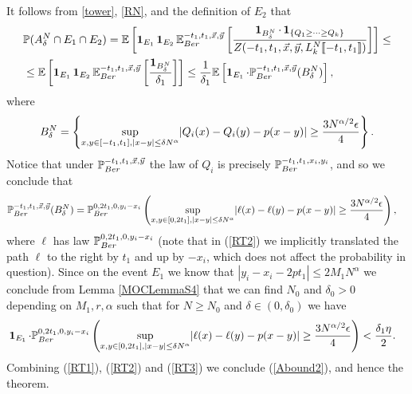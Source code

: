 It follows from \eqref{tower}, \eqref{RN}, and the definition of $E_2$ that
\begin{equation}\label{RT1}
\begin{split}
&\mathbb{P}(A^N_\delta\cap E_1\cap E_2) =\mathbb{E}\left[\operatorname{\mathbf{1}}_{E_1}\operatorname{\mathbf{1}}_{E_2} \mathbb{E}_{Ber}^{-t_1, t_1,\vec x,\vec y}\left[\frac{\operatorname{\mathbf{1}}_{B^N_\delta}\cdot \operatorname{\mathbf{1}}_{\left\{Q_1\geq\cdots\geq Q_{k}\right\}}}{Z(-t_1,t_1,\vec x, \vec y, L^N_{k} \llbracket -t_1, t_1 \rrbracket)}\right]\right] \leq \\
&\leq \mathbb{E}\left[\operatorname{\mathbf{1}}_{E_1}\operatorname{\mathbf{1}}_{E_2}\mathbb{E}_{Ber}^{-t_1,t_1,\vec x,\vec y}\left[\frac{\operatorname{\mathbf{1}}_{B^N_\delta}}{\delta_1}\right]\right] \leq \frac{1}{\delta_1} \mathbb{E}\left[ \operatorname{\mathbf{1}}_{E_1} \cdot\mathbb{P}_{Ber}^{-t_1,t_1,\vec{x}, \vec{y} }(B^N_\delta) \right],
\end{split}
\end{equation}
where 
$$B^N_\delta = \left\{\sup_{{x,y\in [-t_1,t_1], |x-y|\leq \delta N^\alpha}} \abs*{Q_i(x)-Q_i(y)-p(x-y)}\geq \frac{3N^{\alpha/2}\epsilon}4\right\}.$$
Notice that under $\mathbb{P}_{Ber}^{-t_1,t_1,\vec{x}, \vec{y} }$ the law of $Q_i$ is precisely $\mathbb{P}_{Ber}^{-t_1,t_1,x_i, y_i }$, and so we conclude that 
\begin{equation}\label{RT2}
\begin{split}
& \pr_{Ber}^{-t_1,t_1,\vec{x}, \vec{y} }(B^N_\delta) = \pr_{Ber}^{0,2t_1,0, y_i - x_i }\left( \sup_{{x,y\in [0,2t_1], |x-y|\leq \delta N^\alpha}} \abs*{\ell(x)-\ell(y)-p(x-y)}\geq \frac{3N^{\alpha/2}\epsilon}4  \right),
\end{split}
\end{equation}
where $\ell$ has law $\mathbb{P}_{Ber}^{0,2t_1,0, y_i - x_i }$ (note that in (\ref{RT2}) we implicitly translated the path $\ell$ to the right by $t_1$ and up by $-x_i$, which does not affect the probability in question). Since on the event $E_1$ we know that $|y_i -x_i - 2 p t_1| \leq 2M_1 N^{\alpha}$  we conclude from Lemma \ref{MOCLemmaS4} that we can find $N_0$ and $\delta_0 > 0$ depending on $M_1, r, \alpha$ such that for $N \geq N_0$ and $\delta \in (0, \delta_0)$ we have
\begin{equation}\label{RT3}
\begin{split}
& \indic_{E_1} \cdot \pr_{Ber}^{0,2t_1,0, y_i - x_i }\left( \sup_{{x,y\in [0,2t_1], |x-y|\leq \delta N^\alpha}} \abs*{\ell(x)-\ell(y)-p(x-y)}\geq \frac{3N^{\alpha/2}\epsilon}4  \right) < \frac{\delta_1 \eta}{2}.
\end{split}
\end{equation}
Combining (\ref{RT1}), (\ref{RT2}) and (\ref{RT3}) we conclude (\ref{Abound2}), and hence the theorem.

